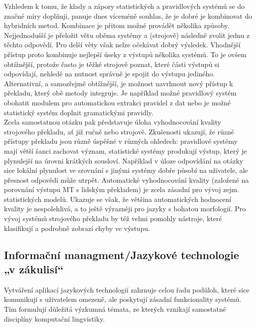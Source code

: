\documentclass[]{../../metanetpaper}
\begin{document}
\begin{multicols}{2}
Vzhledem k tomu, že klady a zápory statistických a pravidlových systémů se do značné míry doplňuji, panuje dnes víceméně souhlas, že je dobré je kombinovat do hybridních metod. Kombinace je přitom možné provádět několika způsoby. Nejjednodušší je přeložit větu oběma systémy a (strojově) následně zvolit jednu z těchto odpovědí. Pro delší věty však nelze očekávat dobrý výsledek. Vhodnější přístup proto kombinuje nejlepší úseky z výstupů několika systémů. To je ovšem obtížnější, protože často je těžké strojově poznat, které části výstupů si odpovídají, nehledě na nutnost správně je spojit do výstupu jediného.
Alternativní, a samozřejmě obtížnější, je možnost navrhnout nový přístup k překladu, který obě metody integruje. Je například možné pravidlový systém obohatit modulem pro automatickou extrakci pravidel z dat nebo je možné statistický systém doplnit gramatickými pravidly.\\
Zcela samostatnou otázku pak představuje úloha vyhodnocování kvality strojového překladu, ať již ručně nebo strojově. Zkušenosti ukazují, že různé přístupy překladu jsou různě úspěšné v různých ohledech: pravidlové systémy mají větší šanci zachovat význam, statistické systémy produkují výstup, který je plynulejší na úrovni krátkých sousloví. Například v úloze odpovídání na otázky sice lokální plynulost ve srovnání s jinými systémy dobře působí na uživatele, ale přesnost odpovědí může utrpět. Automatické vyhodnocování kvality (založené na porovnání výstupu MT s lidským překladem) je zcela zásadní pro vývoj zejm. statistických modelů. Ukazuje se však, že většina automatických hodnocení kvality je nespolehlivá, a to ještě výrazněji pro jazyky s bohatou morfologií. Pro vývoj systémů strojového překladu by též velmi pomohly nástroje, které klasifikují a podrobně zobrazí chyby ve výstupu.

\subsection{Informační managment/Jazykové technologie „v zákulisí“}

Vytváření aplikací jazykových technologií zahrnuje celou řadu podúloh, které sice komunikují s uživatelem omezeně, ale poskytují zásadní funkcionality systémů. Tím formulují důležitá výzkumná témata, ze kterých vznikají samostatné disciplíny komputační lingvistiky.


\end{multicols}
\end{document}
